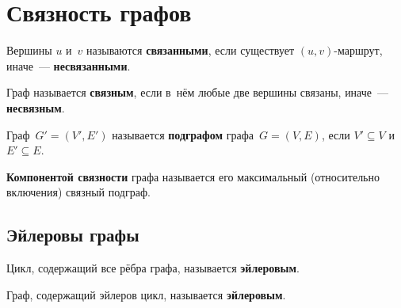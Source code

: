 \section{Связность графов}
\begin{definition}
	Вершины $u$ и~$v$ называются \textbf{связанными}, если существует $(u, v)$-маршрут, иначе~---
	\textbf{несвязанными}.
\end{definition}

\begin{definition}
	Граф называется \textbf{связным}, если в~нём любые две вершины связаны, иначе~--- \textbf{несвязным}.
\end{definition}

\begin{definition}
	Граф~$G' = (V', E')$ называется \textbf{подграфом} графа~$G = (V, E)$, если $V' \subseteq V$ и
	~$E' \subseteq E$.
\end{definition}

\begin{definition}
	\textbf{Компонентой связности} графа называется его максимальный (относительно включения)
	связный подграф.
\end{definition}

\subsection{Эйлеровы графы}
\begin{definition}
	Цикл, содержащий все рёбра графа, называется \textbf{эйлеровым}.
\end{definition}

\begin{definition}
	Граф, содержащий эйлеров цикл, называется \textbf{эйлеровым}.
\end{definition}

